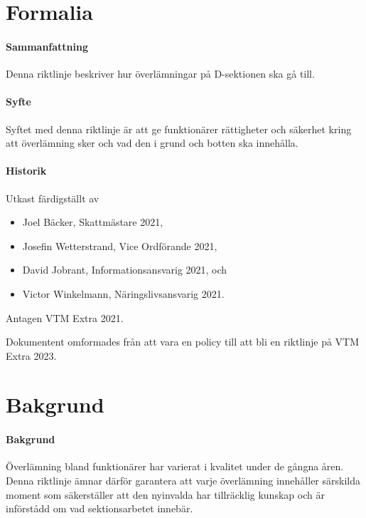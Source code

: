\documentclass{dsekguideline}
\begin{document}
\maketitle
\section{Formalia}

\paragraph{Sammanfattning}
Denna riktlinje beskriver hur överlämningar på D-sektionen ska gå till.

\paragraph{Syfte}
Syftet med denna riktlinje är att ge funktionärer rättigheter och säkerhet kring
att överlämning sker och vad den i grund och botten ska innehålla.

\paragraph{Historik}
Utkast färdigställt av
\begin{itemize}
  \item Joel Bäcker, Skattmästare 2021,
  \item Josefin Wetterstrand, Vice Ordförande 2021,
  \item David Jobrant, Informationsansvarig 2021, och
  \item Victor Winkelmann, Näringslivsansvarig 2021.
\end{itemize}
Antagen VTM Extra 2021.

Dokumentent omformades från att vara en policy till att bli en riktlinje på
VTM Extra 2023.

\section{Bakgrund}

\paragraph{Bakgrund}
Överlämning bland funktionärer har varierat i kvalitet under de gångna
åren. Denna riktlinje ämnar därför garantera att varje överlämning innehåller
särskilda moment som säkerställer att den nyinvalda har tillräcklig kunskap
och är införstådd om vad sektionsarbetet innebär.
\end{document}
